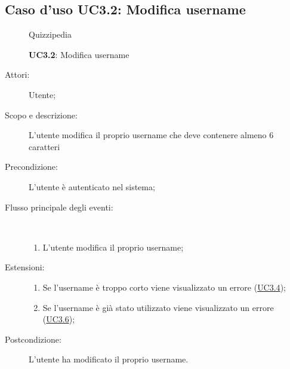 \subsection{Caso d'uso UC3.2: Modifica username}
	\begin{figure}[H]
		\centering
		\begin{resizedtikzpicture}{\textwidth}
		\begin{umlsystem}[x=0, fill=lightgray!20]{Quizzipedia}
		\end{umlsystem}
		\end{resizedtikzpicture}
		\caption{\textbf{UC3.2}: Modifica username}
		\label{UC3.2}
	\end{figure}
\begin{description}
\item[Attori:] Utente;
\item[Scopo e descrizione:] L'utente modifica il proprio username che deve contenere almeno 6 caratteri
      \item[Precondizione:] L'utente è autenticato nel sistema;

        \item[Flusso principale degli eventi:] \ 
 \begin{enumerate}
          \item L’utente modifica il proprio username;

      \end{enumerate}
    \item[Estensioni:]
      \begin{enumerate}
          \item Se l'username è troppo corto viene visualizzato un errore (\hyperlink{UC3.4}{UC3.4});
          \item Se l'username è già stato utilizzato viene visualizzato un errore (\hyperlink{UC3.6}{UC3.6});

      \end{enumerate}
    \item[Postcondizione:] L'utente ha modificato il proprio username.
  \end{description}
\hypertarget{UC3.3}{}
